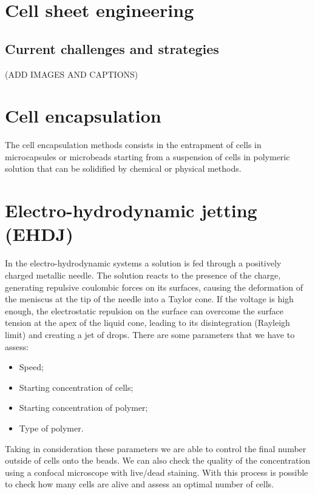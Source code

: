 \section{Cell sheet engineering}

    \subsection{Current challenges and strategies}
     (ADD IMAGES AND CAPTIONS)
     
\section{Cell encapsulation}

The cell encapsulation methods consists in the entrapment of cells in microcapsules or microbeads starting from a suspension of cells in polymeric solution that can be solidified by chemical or physical methods. 

\section{Electro-hydrodynamic jetting (EHDJ)}

In the electro-hydrodynamic systems a solution is fed through a positively charged metallic needle. The solution reacts to the presence of the charge, generating repulsive coulombic forces on its surfaces, causing the deformation of the meniscus at the tip of the needle into a Taylor cone. If the voltage is high enough, the electrostatic repulsion on the surface can overcome the surface tension at the apex of the liquid cone, leading to its disintegration (Rayleigh limit) and creating a jet of drops.
There are some parameters that we have to assess:

\begin{multicols}{2}
    \begin{itemize}
        \item Speed;
        \item Starting concentration of cells;
        \item Starting concentration of polymer;    
        \item Type of polymer. 
    \end{itemize}
\end{multicols}

Taking in consideration these parameters we are able to control the final number outside of cells onto the beads. We can also check the quality of the concentration using a confocal microscope with live/dead staining. With this process is possible to check how many cells are alive and assess an optimal number of cells. 

